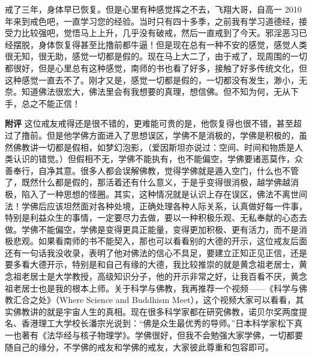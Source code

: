 \begin{case}
    戒了三年，身体早已恢复。但是心里有种感觉挥之不去，飞翔大哥，自高一 2010 年来到戒色吧，一直学习您的经验。当时只有四十多季，之前我有学习道德经，接受力比较强吧，觉悟马上上升，几乎没有破戒，然后一直戒到了今天。邪淫恶习已经摆脱，身体恢复得甚至比撸前都牛逼！但是现在总有一种不安的感觉，感觉人类很无知，很无助，感觉一切都是假的。现在马上大二了，由于戒了，现周围的一切都很好，但是心里总有这种感觉，南师的书也看了好多，接触了好多传统文化，但这种感觉一直去不了。刚才又是，感觉一切都是假的，一切都没有发生，渺小，无奈。知道佛法很宏大，佛法里会有我想要的真理，想信佛。但不知为何，无从下手，总之不能正信！

    \textbf{附评} 这位戒友戒得还是很不错的，更难能可贵的是，他恢复得也很不错，甚至超过了撸前。但是他学佛方面进入了思想误区，学佛不是消极的，学佛是积极的，虽然佛教讲一切都是假相，如梦幻泡影，（爱因斯坦亦说过：空间、时间和物质是人类认识的错觉。）但假相不无，学佛不能执有，也不能偏空，学佛要诸恶莫作，众善奉行，自净其意。很多人都会误解佛教，觉得学佛就是遁入空门，什么也不管了，既然什么都是假的，那活着还有什么意义，于是乎变得很消极，越学佛越消极，陷入了一种思想的怪圈。其实，这种情况就是认识上存在误区，佛法不离世间法！学佛后应该坦然面对各种处境，正确处理各种人际关系，认真做好每一件事，特别是利益众生的事情，一定要尽力去做，要以一种积极乐观、无私奉献的心态去做。学佛不能偏空，学佛是变得更具正能量，变得更加积极、更有活力，而不是消极悲观。如果看南师的书不能契入，那也可以看看别的大德的开示，这位戒友后面还有一句话我没收录，表明了他对佛法的信心不具足，要建立正知正见正信，还是要多看大德开示，特别是和自己有缘的大德，我比较推崇的就是黄念祖老居士，黄念祖老居士是大学教授，高级知识分子，他的开示非常之好，让我百看不厌，黄念祖老居士也是我的根本上师。关于科学与佛教，我再推荐一个视频——《科学与佛教汇合之处》（Where Science and Buddhism Meet），这个视频大家可以看看，其实佛教讲的就是宇宙人生的真相。现在很多科学家都在研究佛教，诺贝尔奖两度提名、香港理工大学校长潘宗光说到：“佛是众生最优秀的导师。”日本科学家松下真一也著有《法华经与核子物理学》。学佛很好，但我不会勉强大家学佛，一切都要随自己的缘分，不学佛的戒友和学佛的戒友，大家彼此尊重和包容即可。
\end{case}

